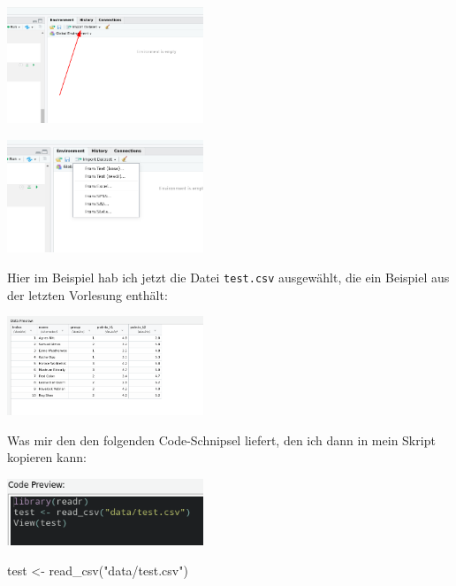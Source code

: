 \documentclass[
]{book}
\newenvironment{Shaded}{\begin{snugshade}}{\end{snugshade}}
\newcommand{\FunctionTok}[1]{\textcolor[rgb]{0.00,0.00,0.00}{#1}}
\newcommand{\NormalTok}[1]{#1}
\newcommand{\OtherTok}[1]{\textcolor[rgb]{0.56,0.35,0.01}{#1}}
\newcommand{\StringTok}[1]{\textcolor[rgb]{0.31,0.60,0.02}{#1}}
\begin{document}
\begin{center}\includegraphics[width=166.666666666667pt]{imgs/menu} \end{center}

\begin{center}\includegraphics[width=166.666666666667pt]{imgs/menu2} \end{center}

Hier im Beispiel hab ich jetzt die Datei \texttt{test.csv} ausgewählt, die ein Beispiel aus der letzten Vorlesung enthält:

\begin{center}\includegraphics[width=166.666666666667pt]{imgs/text_csv1} \end{center}

Was mir den den folgenden Code-Schnipsel liefert, den ich dann in mein Skript kopieren kann:

\begin{center}\includegraphics[width=166.666666666667pt]{imgs/text_csv2} \end{center}

\begin{Shaded}
\begin{Highlighting}[]
\NormalTok{test }\OtherTok{\textless{}{-}} \FunctionTok{read\_csv}\NormalTok{(}\StringTok{"data/test.csv"}\NormalTok{)}
\end{Highlighting}
\end{Shaded}
\end{document}
